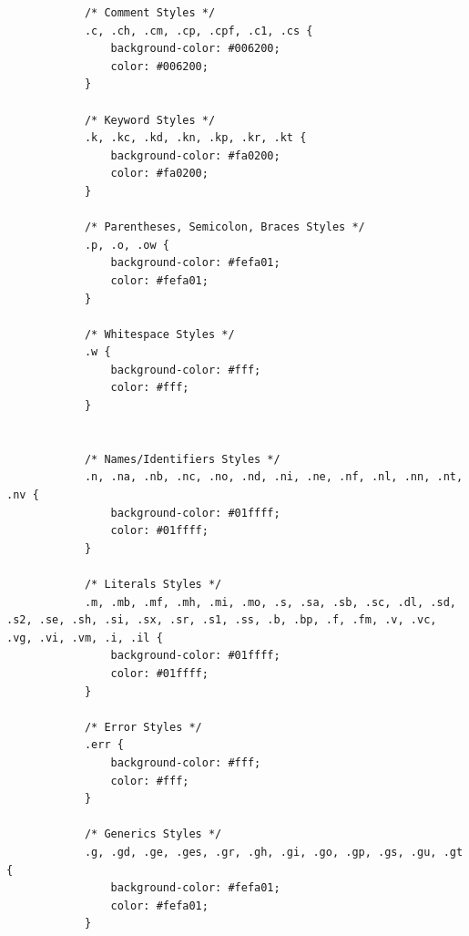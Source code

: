 \documentclass[%
class=scrreprt,
chapterprefix=false,%
open=right,%
twoside=true,%
paper=a4,%
logofile={Logo\_zentral\_farbig\_EN.png},%
thesistype=master,%
UKenglish,%
]{se2thesis}
\theoremstyle{definition}
\begin{document}

		\begin{verbatim}
			/* Comment Styles */
			.c, .ch, .cm, .cp, .cpf, .c1, .cs {
				background-color: #006200;
				color: #006200;
			}
			
			/* Keyword Styles */
			.k, .kc, .kd, .kn, .kp, .kr, .kt {
				background-color: #fa0200;
				color: #fa0200;
			}
			
			/* Parentheses, Semicolon, Braces Styles */
			.p, .o, .ow {
				background-color: #fefa01;
				color: #fefa01;
			}
			
			/* Whitespace Styles */
			.w {
				background-color: #fff;
				color: #fff;
			}
			
			
			/* Names/Identifiers Styles */
			.n, .na, .nb, .nc, .no, .nd, .ni, .ne, .nf, .nl, .nn, .nt, .nv {
				background-color: #01ffff;
				color: #01ffff;
			}
			
			/* Literals Styles */
			.m, .mb, .mf, .mh, .mi, .mo, .s, .sa, .sb, .sc, .dl, .sd, .s2, .se, .sh, .si, .sx, .sr, .s1, .ss, .b, .bp, .f, .fm, .v, .vc, .vg, .vi, .vm, .i, .il {
				background-color: #01ffff;
				color: #01ffff;
			}
			
			/* Error Styles */
			.err {
				background-color: #fff;
				color: #fff;
			}
			
			/* Generics Styles */
			.g, .gd, .ge, .ges, .gr, .gh, .gi, .go, .gp, .gs, .gu, .gt {
				background-color: #fefa01;
				color: #fefa01;
			}
		\end{verbatim}
		\label{lst:model-visual-css}
	
\end{document}

